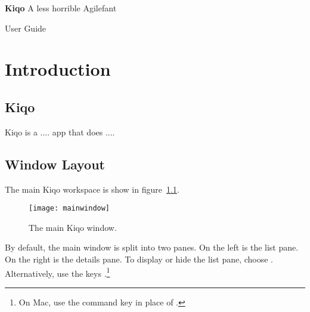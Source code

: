 \documentclass[11pt,fleqn]{book} %
\begin{document}

\begingroup
\thispagestyle{empty}
\centering
\vspace*{5cm}
\par\normalfont\fontsize{35}{35}\sffamily\selectfont
\textbf{Kiqo}
{\LARGE A less horrible Agilefant}\par %
\vspace*{1cm}
{\Huge User Guide}\par %
\endgroup


\tableofcontents %


\chapter{Introduction}
\section{Kiqo}
Kiqo is a .... app that does ....

\section{Window Layout}
The main Kiqo workspace is show in figure~\ref{fig:mainwindow}.

\begin{figure}[h]
  \centering
  \texttt{[image: mainwindow]}
  \caption{The main Kiqo window.\label{fig:mainwindow}}
\end{figure}

\pagebreak
By default, the main window is split into two panes.
On the left is the list pane.
On the right is the details pane.
To display or hide the list pane, choose .
Alternatively, use the keys .\footnote{On Mac,
use the command key \keys{\cmd} in place of \keys{\ctrl}.}\\
\end{document}
